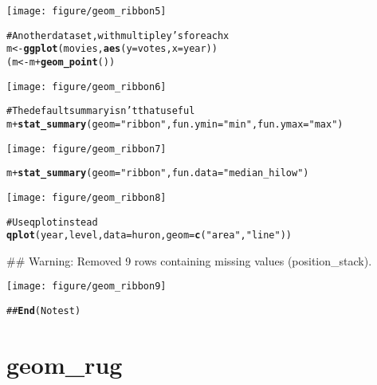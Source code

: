 \documentclass[a4paper,titlepage]{tufte-handout}\usepackage{graphicx, color}
\makeatletter
\def\maxwidth{ %
  \ifdim\Gin@nat@width>\linewidth
    \linewidth
  \else
    \Gin@nat@width
  \fi
}
\newcommand{\hlfunctioncall}[1]{\textcolor[rgb]{0.501960784313725,0,0.329411764705882}{\textbf{#1}}}%
\newcommand{\hlstring}[1]{\textcolor[rgb]{0.6,0.6,1}{#1}}%
\newcommand{\hlcomment}[1]{\textcolor[rgb]{0.180392156862745,0.6,0.341176470588235}{#1}}%
\newenvironment{kframe}{%
 \def\at@end@of@kframe{}%
 \ifinner\ifhmode%
  \def\at@end@of@kframe{\end{minipage}}%
  \begin{minipage}{\columnwidth}%
 \fi\fi%
 \def\FrameCommand##1{\hskip\@totalleftmargin \hskip-\fboxsep
 \colorbox{shadecolor}{##1}\hskip-\fboxsep
     \hskip-\linewidth \hskip-\@totalleftmargin \hskip\columnwidth}%
 \MakeFramed {\advance\hsize-\width
   \@totalleftmargin\z@ \linewidth\hsize
   \@setminipage}}%
 {\par\unskip\endMakeFramed%
 \at@end@of@kframe}
\newenvironment{knitrout}{}{} %
\makeatother
\begin{document}
\begin{knitrout}
\begin{kframe}
\end{kframe}\texttt{[image: figure/geom\_ribbon5]} \begin{kframe}\begin{alltt}
\hlcomment{# Another data set, with multiple y's for each x}
m <- \hlfunctioncall{ggplot}(movies, \hlfunctioncall{aes}(y=votes, x=year))
(m <- m + \hlfunctioncall{geom_point}())
\end{alltt}
\end{kframe}\texttt{[image: figure/geom\_ribbon6]} \begin{kframe}\begin{alltt}
\hlcomment{# The default summary isn't that useful}
m + \hlfunctioncall{stat_summary}(geom=\hlstring{"ribbon"}, fun.ymin=\hlstring{"min"}, fun.ymax=\hlstring{"max"})
\end{alltt}
\end{kframe}\texttt{[image: figure/geom\_ribbon7]} \begin{kframe}\begin{alltt}
m + \hlfunctioncall{stat_summary}(geom=\hlstring{"ribbon"}, fun.data=\hlstring{"median_hilow"})
\end{alltt}
\end{kframe}\texttt{[image: figure/geom\_ribbon8]} \begin{kframe}\begin{alltt}
\hlcomment{# Use qplot instead}
\hlfunctioncall{qplot}(year, level, data=huron, geom=\hlfunctioncall{c}(\hlstring{"area"}, \hlstring{"line"}))
\end{alltt}
\begin{flushleft}\ttfamily\noindent\textcolor{warningcolor}{\#\# Warning: Removed 9 rows containing missing values (position\_stack).}\end{flushleft}\end{kframe}\texttt{[image: figure/geom\_ribbon9]} \begin{kframe}\begin{alltt}
\hlcomment{## \hlfunctioncall{End}(No test)}
\end{alltt}
\end{kframe}
\end{knitrout}


\section{geom\_rug}
\end{document}
